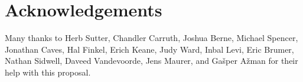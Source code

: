 \section*{Acknowledgements}

Many thanks to Herb Sutter, Chandler Carruth, Joshua Berne, Michael Spencer, Jonathan Caves, Hal Finkel, Erich Keane, Judy Ward, Inbal Levi, Eric Brumer, Nathan Sidwell, Daveed Vandevoorde, Jens Maurer, and Ga\v sper A\v zman for their help with this proposal.

\renewcommand{\bibname}{References}



